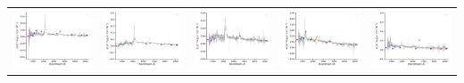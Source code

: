 \begin{center}
\begin{longtable}{l l l l l }
    \includegraphics[width=0.19\linewidth, clip]{Figs/Figs-sdss/spec-3777-55210-0616-SPLUS-n02s25-003956.pdf} & \includegraphics[width=0.19\linewidth, clip]{Figs/Figs-sdss/spec-3842-55565-0582-SPLUS-n02n20-021184.pdf} & \includegraphics[width=0.19\linewidth, clip]{Figs/Figs-sdss/spec-3845-55323-0406-SPLUS-n01s24-009687.pdf} & \includegraphics[width=0.19\linewidth, clip]{Figs/Figs-sdss/spec-3847-55588-0744-SPLUS-n02n27-026395.pdf} & \includegraphics[width=0.19\linewidth, clip]{Figs/Figs-sdss/spec-3847-55588-0794-SPLUS-n02n27-022071.pdf} \\

\end{longtable}
\end{center}
